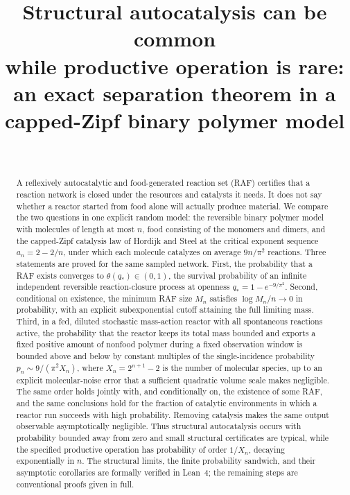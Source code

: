 \documentclass[11pt,letterpaper]{article}
\title{Structural autocatalysis can be common\\ while productive operation is rare:\\
\large an exact separation theorem in a capped-Zipf binary polymer model}
\author{\PaperAuthor\\[2pt]\small\PaperAffiliation}
\date{\PaperDate}
\theoremstyle{plain}
\theoremstyle{definition}
\theoremstyle{remark}
\numberwithin{equation}{section}
\begin{document}
\maketitle

\begin{abstract}
A reflexively autocatalytic and food-generated reaction set (RAF) certifies that a reaction network is closed under the resources and catalysts it needs. It does not say whether a reactor started from food alone will actually produce material. We compare the two questions in one explicit random model: the reversible binary polymer model with molecules of length at most $n$, food consisting of the monomers and dimers, and the capped-Zipf catalysis law of Hordijk and Steel at the critical exponent sequence $a_n=2-2/n$, under which each molecule catalyzes on average $9n/\pi^2$ reactions. Three statements are proved for the same sampled network. First, the probability that a RAF exists converges to $\theta(q_*)\in(0,1)$, the survival probability of an infinite independent reversible reaction-closure process at openness $q_*=1-e^{-9/\pi^2}$. Second, conditional on existence, the minimum RAF size $M_n$ satisfies $\log M_n/n\to0$ in probability, with an explicit subexponential cutoff attaining the full limiting mass. Third, in a fed, diluted stochastic mass-action reactor with all spontaneous reactions active, the probability that the reactor keeps its total mass bounded and exports a fixed positive amount of nonfood polymer during a fixed observation window is bounded above and below by constant multiples of the single-incidence probability $p_n\sim9/(\pi^2X_n)$, where $X_n=2^{n+1}-2$ is the number of molecular species, up to an explicit molecular-noise error that a sufficient quadratic volume scale makes negligible. The same order holds jointly with, and conditionally on, the existence of some RAF, and the same conclusions hold for the fraction of catalytic environments in which a reactor run succeeds with high probability. Removing catalysis makes the same output observable asymptotically negligible. Thus structural autocatalysis occurs with probability bounded away from zero and small structural certificates are typical, while the specified productive operation has probability of order $1/X_n$, decaying exponentially in $n$. The structural limits, the finite probability sandwich, and their asymptotic corollaries are formally verified in Lean~4; the remaining steps are conventional proofs given in full.
\end{abstract}
\end{document}

